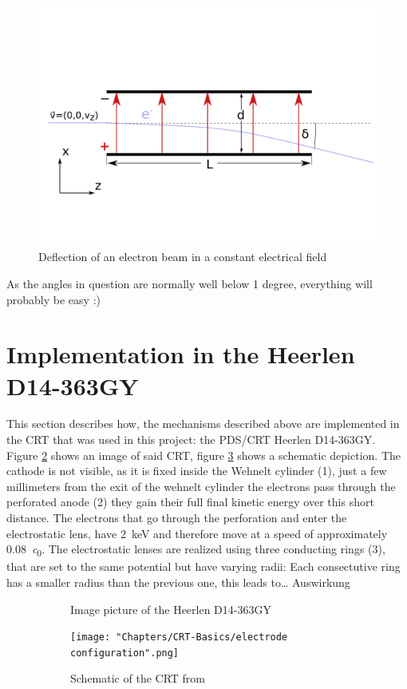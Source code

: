 \begin{figure}
	\centering
	\includegraphics[width=0.7\linewidth]{Chapters/CRT-Basics/DeflectionPlate2}
	\caption{Deflection of an electron beam in a constant electrical field}
	\label{fig:deflectionplate2}
\end{figure}


As the angles in question are normally well below 1 degree, everything will probably be easy :) 

\section{Implementation in the Heerlen D14-363GY }

This section describes how, the mechanisms described above are implemented in the CRT that was used in this project: the PDS/CRT Heerlen D14-363GY. Figure \ref{fig:FotoCRT}  shows an image of said CRT, figure \ref{fig:SchemeCRT} shows a schematic depiction. The cathode is not visible, as it is fixed inside the Wehnelt cylinder (1), just a few millimeters from the exit of the wehnelt cylinder the electrons pass through the perforated anode (2) they gain their full final kinetic energy over this short distance. The electrons that go through the perforation and enter the electrostatic lens, have \SI{2}{\kilo\electronvolt} and therefore move at a speed of approximately \SI{0.08}{\clight}. 
The electrostatic lenses are realized using three conducting rings (3), that are set to the same potential but have varying radii: Each consectutive ring has a smaller radius than the previous one, this leads to…  
 Auswirkung 

\begin{figure}
	\centering
	\begin{subfigure}{.5\textwidth}
		\centering
		\caption{Image picture of the Heerlen D14-363GY}
		\label{fig:FotoCRT}
	\end{subfigure}%
	\begin{subfigure}{.5\textwidth}
		\centering
		\texttt{[image: "Chapters/CRT-Basics/electrode configuration".png]}
		\caption{Schematic of the CRT from \cite{D14363GY123-manual}}
		\label{fig:SchemeCRT}
	\end{subfigure}
	\caption{}
	\label{}
\end{figure}


